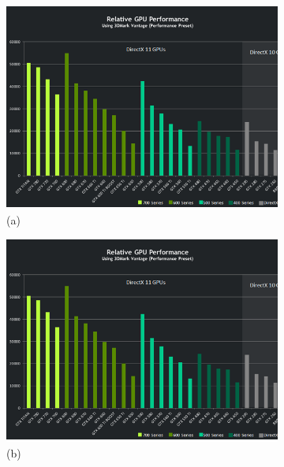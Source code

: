 \documentclass{IEEEtran}
\begin{document}
\begin{figure}[t!]
  \centering
  \begin{subfigure}[b]{0.2\linewidth}
    \includegraphics[width=\linewidth]{Performance.png}
    \caption{(a)}
  \end{subfigure}
  \begin{subfigure}[b]{0.2\linewidth}
    \includegraphics[width=\linewidth]{Performance.png}
    \caption{(b)}
  \end{subfigure}
  \begin{subfigure}[b]{0.2\linewidth}

\end{subfigure}
\end{figure}
\end{document}
